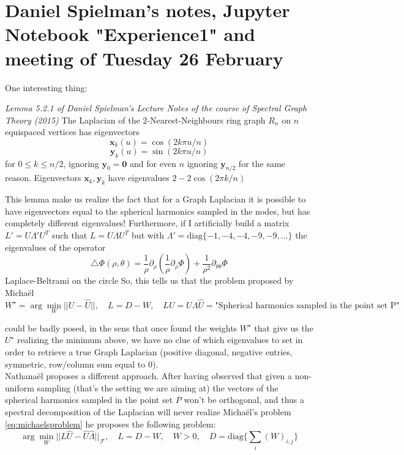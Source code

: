\section{Daniel Spielman's notes, Jupyter Notebook "Experience1" and meeting of Tuesday 26 February}

One interesting thing:

\begin{theorem}{\textit{Lemma 5.2.1 of Daniel Spielman's Lecture Notes of the course of Spectral Graph Theory (2015)}}
	\label{theo:eigenvectors on the ring}
	The Laplacian of the 2-Nearest-Neighbours ring graph $R_n$ on $n$ equispaced vertices has eigenvectors
	$$\mathbf x_k(u) = \cos(2k\pi u/n)$$
	$$\mathbf y_k(u) = \sin(2k\pi u/n)$$
	for $0\leq k\leq n/2$, ignoring $\mathbf y_0 = \mathbf 0$ and for even $n$ ignoring $\mathbf y_{n/2}$ for the same reason. Eigenvectors $\mathbf x_k, \mathbf y_k$ have eigenvalues $2-2\cos(2\pi k/n)$
\end{theorem}

This lemma make us realize the fact that for a Graph Laplacian it is possible to have eigenvectors equal to the spherical harmonics sampled in the nodes, but has completely different eigenvalues! Furthermore, if I artificially build a matrix $L'=U\Lambda'U^T$ such that $L=U\Lambda U^T$ but with $\Lambda'=\text{diag}\{-1, -4, -4, -9, -9, ...\}$ the eigenvalues of the operator  
$$\triangle \Phi(\rho, \theta) = \frac{1}{\rho}\partial_\rho \left(\frac{1}{\rho}\partial_\rho \Phi\right) + \frac{1}{\rho^2}\partial_{\theta\theta}\Phi$$ 
Laplace-Beltrami on the circle  So, this tells us that the problem proposed by Micha\"el
\begin{equation}\label{eq:michaelsproblem}
	W^\star = \arg\min_W||U-\hat U||, \quad L=D-W,\quad LU=U\Lambda
	 \hat U = \text{"Spherical harmonics sampled in the point set P"}
\end{equation}

could be badly posed, in the sens that once found the weights $W^\star$ that give us the $U^\star$ realizing the minimum above, we have no clue of which eigenvalues to set in order to retrieve a true Graph Laplacian (positive diagonal, negative entries, symmetric, row/column sum equal to $0$).\\
Nathana\"el proposes a different approach. After having observed that given a non-uniform sampling (that's the setting we are aiming at) the vectors of the spherical harmonics sampled in the point set $P$ won't be orthogonal, and thus a spectral decomposition of the Laplacian will never realize Micha\"el's problem \ref{eq:michaelsproblem} he proposes the following problem:
\begin{equation}\label{eq:nathanaelsproblem}
	\arg\min_W||L\hat U-\hat U\hat \Lambda||_\mathcal F,\quad L=D-W,\quad  W>0,\quad D=\text{diag}\{\sum_{i}(W)_{i,j}\}
\end{equation}

